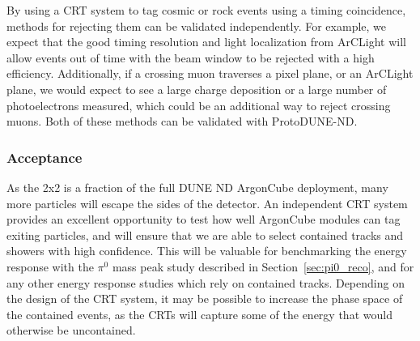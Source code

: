 By using a CRT system to tag cosmic or rock events using a timing coincidence, methods for rejecting them can be validated independently. For example, we expect that the good timing resolution and light localization from ArCLight will allow events out of time with the beam window to be rejected with a high efficiency. Additionally, if a crossing muon traverses a pixel plane, or an ArCLight plane, we would expect to see a large charge deposition or a large number of photoelectrons measured, which could be an additional way to reject crossing muons. Both of these methods can be validated with ProtoDUNE-ND.

\subsubsection{Acceptance}
As the 2x2 is a fraction of the full DUNE ND ArgonCube deployment, many more particles will escape the sides of the detector. An independent CRT system provides an excellent opportunity to test how well ArgonCube modules can tag exiting particles, and will ensure that we are able to select contained tracks and showers with high confidence. This will be valuable for benchmarking the energy response with the $\pi^{0}$ mass peak study described in Section~\ref{sec:pi0_reco}, and for any other energy response studies which rely on contained tracks. Depending on the design of the CRT system, it may be possible to increase the phase space of the contained events, as the CRTs will capture some of the energy that would otherwise be uncontained.
